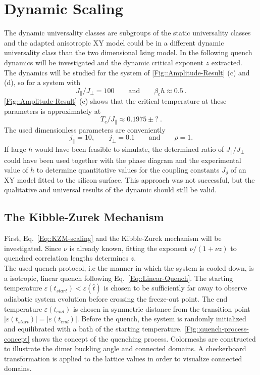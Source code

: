 	\section{Dynamic Scaling}	
	The dynamic universality classes are subgroups of the static universality classes \cite{hohenberg1977theory} and the adapted anisotropic XY model could be in a different dynamic universality class than the two dimensional Ising model. In the following quench dynamics will be investigated and the dynamic critical exponent $z$ extracted. \\
	
	The dynamics will be studied for the system of \autoref{Fig::Amplitude-Result} (c) and (d), so for a system with 
	\begin{equation}
		J_\parallel /	J_\perp = 100 \qquad \text{and} \qquad \beta_c h \approx	0.5~.
	\end{equation}
	\autoref{Fig::Amplitude-Result} (c) shows that the critical temperature at these parameters is approximately at
	\begin{equation}
		T_c /	J_\parallel \approx 0.1975 \pm ?~.
	\end{equation}
	The used dimensionless parameters are conveniently
	\begin{equation}
		j_\parallel =	10, \qquad j_\perp = 0.1 \qquad \text{and} \qquad \rho =	1.
	\end{equation}
	If large $h$ would have been feasible to simulate, the determined ratio of $J_\parallel / J_\perp $ could have been used together with the phase diagram and the experimental value of $h$ to determine quantitative values for the coupling constants $J_\delta$ of an XY model fitted to the silicon surface. This approach was not successful, but the qualitative and universal results of the dynamic should still be valid. 
	\subsection{The Kibble-Zurek Mechanism}
	First, Eq.~\eqref{Eq::KZM-scaling} and the Kibble-Zurek mechanism will be investigated. Since $\nu$ is already known, fitting the exponent $\nu /	(1 + \nu z)$ to quenched correlation lengths determines $z$. \\
	
	The used quench protocol, i.e the manner in which the system is cooled down, is a isotropic, linear quench following Eq.~\eqref{Eq::Linear-Quench}. The starting temperature $\varepsilon(t_{start}) < \varepsilon(\hat{t})$ is chosen to be sufficiently far away to observe adiabatic system evolution before crossing the freeze-out point. The end temperature $\varepsilon(t_{end})$ is chosen in symmetric distance from the transition point $|\varepsilon(t_{start})|=|\varepsilon(t_{end})|$. Before the quench, the system is randomly initialized and equilibrated with a bath of the starting temperature. \autoref{Fig::quench-process-concept} shows the concept of the quenching process. Colormeshs are constructed to illustrate the dimer buckling angle and connected domains. A checkerboard transformation is applied to the lattice values in order to visualize connected domains.  \\
	
